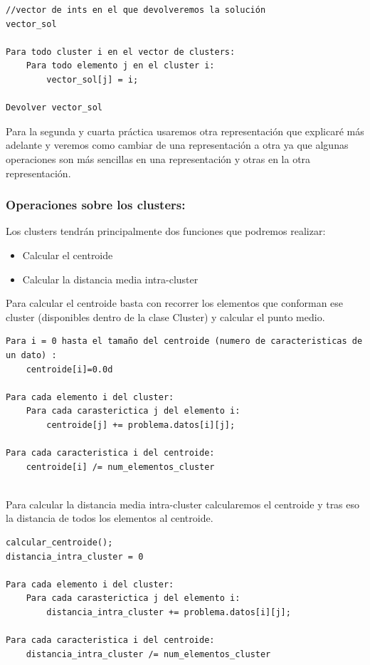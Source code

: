 \documentclass[12pt, spanish]{article}
\begin{document}
\begin{lstlisting}
//vector de ints en el que devolveremos la solución
vector_sol

Para todo cluster i en el vector de clusters:
	Para todo elemento j en el cluster i:
		vector_sol[j] = i;

Devolver vector_sol

\end{lstlisting}

Para la segunda y cuarta práctica usaremos otra representación que explicaré más adelante y veremos como cambiar de una representación a otra ya que algunas operaciones son más sencillas en una representación y otras en la otra representación.

\subsubsection{Operaciones sobre los clusters:}

Los clusters tendrán principalmente dos funciones que podremos realizar:

\begin{itemize}
	\item {Calcular el centroide}
	\item {Calcular la distancia media intra-cluster}
\end{itemize}

Para calcular el centroide basta con recorrer los elementos que conforman ese cluster (disponibles dentro de la clase Cluster) y calcular el punto medio.

\begin{lstlisting}
Para i = 0 hasta el tamaño del centroide (numero de caracteristicas de un dato) :
	centroide[i]=0.0d

Para cada elemento i del cluster:
	Para cada carasterictica j del elemento i:
		centroide[j] += problema.datos[i][j];

Para cada caracteristica i del centroide:
	centroide[i] /= num_elementos_cluster


\end{lstlisting}

Para calcular la distancia media intra-cluster calcularemos el centroide y tras eso la distancia de todos los elementos al centroide.


\begin{lstlisting}
calcular_centroide();
distancia_intra_cluster = 0

Para cada elemento i del cluster:
	Para cada carasterictica j del elemento i:
		distancia_intra_cluster += problema.datos[i][j];

Para cada caracteristica i del centroide:
	distancia_intra_cluster /= num_elementos_cluster


\end{lstlisting}
\end{document}
